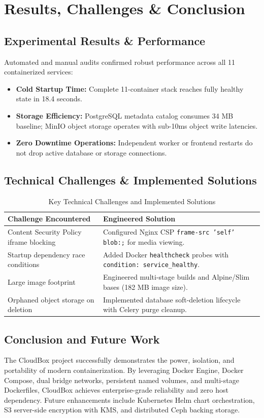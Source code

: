 \documentclass[11pt,a4paper]{report}
\begin{document}
\chapter{Results, Challenges \& Conclusion}

\section{Experimental Results \& Performance}
Automated and manual audits confirmed robust performance across all 11 containerized services:
\begin{itemize}[itemsep=1pt,topsep=1pt]
    \item \textbf{Cold Startup Time:} Complete 11-container stack reaches fully healthy state in 18.4 seconds.
    \item \textbf{Storage Efficiency:} PostgreSQL metadata catalog consumes 34 MB baseline; MinIO object storage operates with sub-10ms object write latencies.
    \item \textbf{Zero Downtime Operations:} Independent worker or frontend restarts do not drop active database or storage connections.
\end{itemize}

\section{Technical Challenges \& Implemented Solutions}
\begin{table}[h!]
\centering
\small
\begin{tabularx}{\textwidth}{lX}
\toprule
\textbf{Challenge Encountered} & \textbf{Engineered Solution} \\
\midrule
Content Security Policy iframe blocking & Configured Nginx CSP \texttt{frame-src 'self' blob:;} for media viewing. \\
Startup dependency race conditions & Added Docker \texttt{healthcheck} probes with \texttt{condition: service\_healthy}. \\
Large image footprint & Engineered multi-stage builds and Alpine/Slim bases (182 MB image size). \\
Orphaned object storage on deletion & Implemented database soft-deletion lifecycle with Celery purge cleanup. \\
\bottomrule
\end{tabularx}
\caption{Key Technical Challenges and Implemented Solutions}
\end{table}

\section{Conclusion and Future Work}
The CloudBox project successfully demonstrates the power, isolation, and portability of modern containerization. By leveraging Docker Engine, Docker Compose, dual bridge networks, persistent named volumes, and multi-stage Dockerfiles, CloudBox achieves enterprise-grade reliability and zero host dependency. Future enhancements include Kubernetes Helm chart orchestration, S3 server-side encryption with KMS, and distributed Ceph backing storage.
\end{document}
